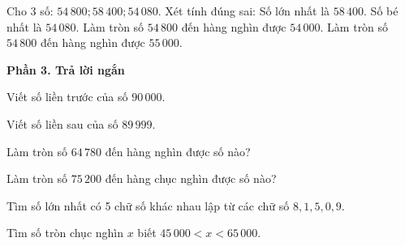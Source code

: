 \begin{ex} %
Cho 3 số: $54\,800; 58\,400; 54\,080$. Xét tính đúng sai:
\choiceTF
{\True Số lớn nhất là $58\,400$.}
{\True Số bé nhất là $54\,080$.}
{Làm tròn số $54\,800$ đến hàng nghìn được $54\,000$.}
{\True Làm tròn số $54\,800$ đến hàng nghìn được $55\,000$.}
\end{ex}

\textbf{Phần 3. Trả lời ngắn}

\begin{ex} %
Viết số liền trước của số $90\,000$.
\end{ex}

\begin{ex} %
Viết số liền sau của số $89\,999$.
\end{ex}

\begin{ex} %
Làm tròn số $64\,780$ đến hàng nghìn được số nào?
\end{ex}

\begin{ex} %
Làm tròn số $75\,200$ đến hàng chục nghìn được số nào?
\end{ex}

\begin{ex} %
Tìm số lớn nhất có 5 chữ số khác nhau lập từ các chữ số $8, 1, 5, 0, 9$.
\end{ex}

\begin{ex} %
Tìm số tròn chục nghìn $x$ biết $45\,000 < x < 65\,000$.
\end{ex}
